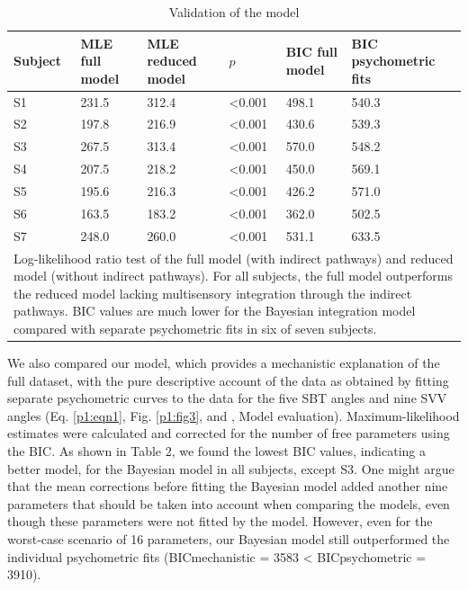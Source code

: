 \begin{table}
\begin{tabular}{llllll}
\hline
Subject & MLE full model & MLE reduced model & $p$ & BIC full model & BIC psychometric fits \\
\hline
S1 & 231.5 & 312.4 & \textless 0.001 & 498.1 & 540.3 \\
S2 & 197.8 & 216.9 & \textless 0.001 & 430.6 & 539.3 \\
S3 & 267.5 & 313.4 & \textless 0.001 & 570.0 & 548.2 \\
S4 & 207.5 & 218.2 & \textless 0.001 & 450.0 & 569.1 \\
S5 & 195.6 & 216.3 & \textless 0.001 & 426.2 & 571.0 \\
S6 & 163.5 & 183.2 & \textless 0.001 & 362.0 & 502.5 \\
S7 & 248.0 & 260.0 & \textless 0.001 & 531.1 & 633.5 \\ 
\hline
\multicolumn{6}{l}{Log-likelihood ratio test of the full model (with indirect pathways) and reduced model (without indirect pathways). For all subjects, the full model outperforms the reduced model lacking multisensory integration through the indirect pathways. BIC values are much lower for the Bayesian integration model compared with separate psychometric fits in six of seven subjects.} \\
\end{tabular}
\caption{Validation of the model}
\label{p1:tab2}
\end{table}


We also compared our model, which provides a mechanistic explanation of the full dataset, with the pure descriptive account of the data as obtained by fitting separate psychometric curves to the data for the five SBT angles and nine SVV angles (Eq. \ref{p1:eqn1}, Fig. \ref{p1:fig3}, and , Model evaluation). Maximum-likelihood estimates were calculated and corrected for the number of free parameters using the BIC. As shown in Table 2, we found the lowest BIC values, indicating a better model, for the Bayesian model in all subjects, except S3. One might argue that the mean corrections before fitting the Bayesian model added another nine parameters that should be taken into account when comparing the models, even though these parameters were not fitted by the model. However, even for the worst-case scenario of 16 parameters, our Bayesian model still outperformed the individual psychometric fits (BICmechanistic = 3583 < BICpsychometric = 3910). 

